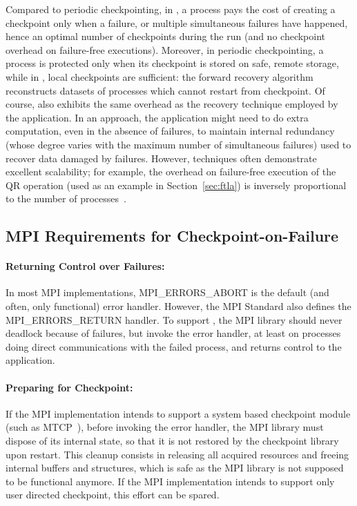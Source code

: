 
Compared to periodic checkpointing, in \cof, a process pays the cost of
creating a checkpoint only when a failure, or multiple simultaneous
failures have happened, hence an optimal number of checkpoints during
the run (and no checkpoint overhead on failure-free executions).
Moreover, in periodic checkpointing, a process is protected only when
its checkpoint is stored on safe, remote storage, while in \cof, local
checkpoints are sufficient: the forward recovery algorithm reconstructs
datasets of processes which cannot restart from checkpoint. Of course,
\cof also exhibits the same overhead as the recovery technique employed
by the application. In an \abft approach, the application might need to
do extra computation, even in the absence of failures, to maintain
internal redundancy (whose degree varies with the maximum number of
simultaneous failures) used to recover data damaged by failures.
However, \abft techniques often demonstrate excellent scalability; for
example, the overhead on failure-free execution of the \abft QR
operation (used as an example in Section~\ref{sec:ftla}) is inversely
proportional to the number of processes~\cite{pengduppopp12}. 

\subsection{MPI Requirements for Checkpoint-on-Failure}\label{sec:interface}

\paragraph*{Returning Control over Failures:} In most MPI
implementations, MPI\_ERRORS\_ABORT is the default (and often, only
functional) error handler. However, the MPI Standard also defines the
MPI\_ERRORS\_RETURN handler. To support \cof, the MPI library should
never deadlock because of failures, but invoke the error handler, at
least on processes doing direct communications with the failed process, 
and returns control to the application.

\paragraph*{Preparing for Checkpoint:} If the MPI implementation intends
to support a system based checkpoint module (such as MTCP~\cite{rieker:pdpta:2006}),
before invoking the error handler, the MPI library must dispose of its
internal state, so that it is not restored by the checkpoint library
upon restart. This cleanup consists in releasing all acquired
resources and freeing internal buffers and structures, which is safe as
the MPI library is not supposed to be functional anymore. If the MPI
implementation intends to support only user directed checkpoint, this
effort can be spared.

